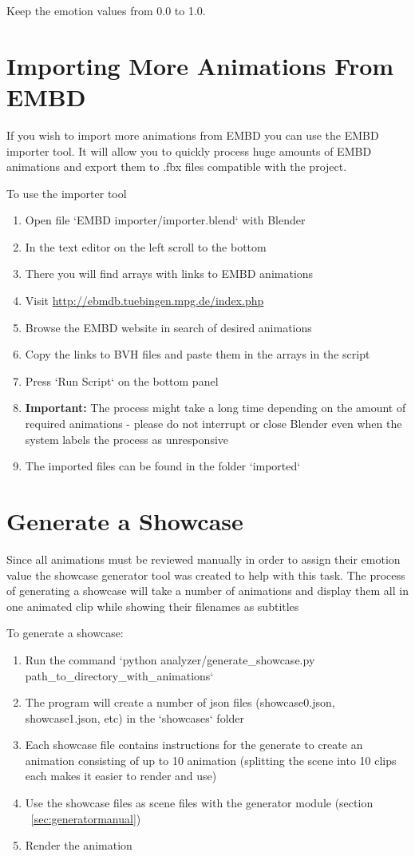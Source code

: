 \noindent Keep the emotion values from 0.0 to 1.0.


\section{Importing More Animations From EMBD}
If you wish to import more animations from EMBD you can use the EMBD importer tool. It will allow you to quickly process huge amounts of EMBD animations and export them to .fbx files compatible with the project.

\noindent To use the importer tool
\begin{enumerate}
	\item Open file `EMBD importer/importer.blend` with Blender
	\item In the text editor on the left scroll to the bottom
	\item There you will find arrays with links to EMBD animations
	\item Visit \url{http://ebmdb.tuebingen.mpg.de/index.php}
	\item Browse the EMBD website in search of desired animations
	\item Copy the links to BVH files and paste them in the arrays in the script
	\item Press `Run Script` on the bottom panel
	\item \textbf{Important:} The process might take a long time depending on the amount of required animations - please do not interrupt or close Blender even when the system labels the process as unresponsive
	\item The imported files can be found in the folder `imported`
\end{enumerate}


\section{Generate a Showcase \label{sec:showcasegeneratormanual}}
Since all animations must be reviewed manually in order to assign their emotion value the showcase generator tool was created to help with this task. The process of generating a showcase will take a number of animations and display them all in one animated clip while showing their filenames as subtitles

\noindent To generate a showcase:
\begin{enumerate}
	\item Run the command `python analyzer/generate\_showcase.py path\_to\_directory\_with\_animations`
	\item The program will create a number of json files (showcase0.json, showcase1.json, etc) in the `showcases` folder
	\item Each showcase file contains instructions for the generate to create an animation consisting of up to 10 animation (splitting the scene into 10 clips each makes it easier to render and use)
	\item Use the showcase files as scene files with the generator module (section ~\ref{sec:generatormanual})
	\item Render the animation
\end{enumerate}


